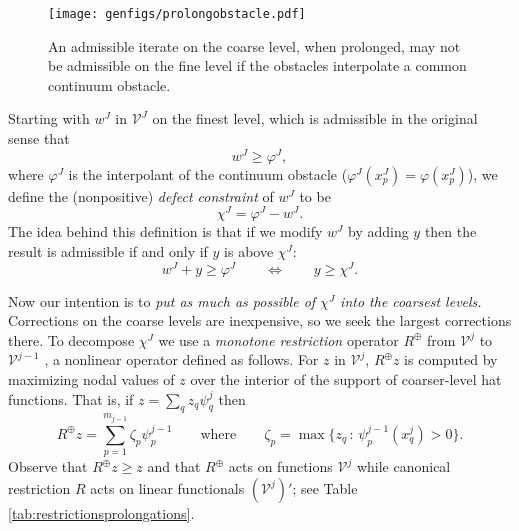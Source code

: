 \documentclass[letterpaper,final,12pt,reqno]{amsart}
\theoremstyle{claim}
\newcommand{\mR}{R^{\bm{\oplus}}}
\numberwithin{equation}{section}
\numberwithin{figure}{section}
\numberwithin{table}{section}
\numberwithin{theorem}{section}
\begin{document}
\begin{figure}
\qquad \texttt{[image: genfigs/prolongobstacle.pdf]}
\caption{An admissible iterate on the coarse level, when prolonged, may not be admissible on the fine level if the obstacles interpolate a common continuum obstacle.}
\label{fig:prolongobstacle}
\end{figure}

Starting with $w^J$ in $\mathcal{V}^J$ on the finest level, which is admissible in the original sense that
\begin{equation}
  w^J \ge \varphi^J, \label{eq:fineadmissibleiterate}
\end{equation}
where $\varphi^J$ is the interpolant of the continuum obstacle ($\varphi^J(x_p^J)=\varphi(x_p^J)$), we define the (nonpositive) \emph{defect constraint} \cite{GraeserKornhuber2009} of $w^J$ to be
\begin{equation}
  \chi^J = \varphi^J - w^J.  \label{eq:defectconstraint}
\end{equation}
The idea behind this definition is that if we modify $w^J$ by adding $y$ then the result is admissible if and only if $y$ is above $\chi^J$:
\begin{equation}
  w^J + y \ge \varphi^J  \qquad \iff \qquad y \ge \chi^J.  \label{eq:defectmeaning}
\end{equation}

Now our intention is to \emph{put as much as possible of $\chi^J$ into the coarsest levels.}  Corrections on the coarse levels are inexpensive, so we seek the largest corrections there.  To decompose $\chi^J$ we use a \emph{monotone restriction} operator $\mR$ from $\mathcal{V}^j$ to $\mathcal{V}^{j-1}$ \cite[equation (4.22)]{GraeserKornhuber2009}, a nonlinear operator defined as follows.  For $z$ in $\mathcal{V}^j$, $\mR z$ is computed by maximizing nodal values of $z$ over the interior of the support of coarser-level hat functions.  That is, if $z = \sum_q z_q \psi_q^j$ then
\begin{equation}
  \mR z = \sum_{p=1}^{m_{j-1}} \zeta_p \psi_p^{j-1} \qquad \text{where} \qquad \zeta_p = \max \{z_q \,:\, \psi_p^{j-1}(x_q^j) > 0\}.  \label{eq:monotonerestriction}
\end{equation}
Observe that $\mR z \ge z$ and that $\mR$ acts on functions $\mathcal{V}^j$ while canonical restriction $R$ acts on linear functionals $(\mathcal{V}^j)'$; see Table \ref{tab:restrictionsprolongations}.
\end{document}
